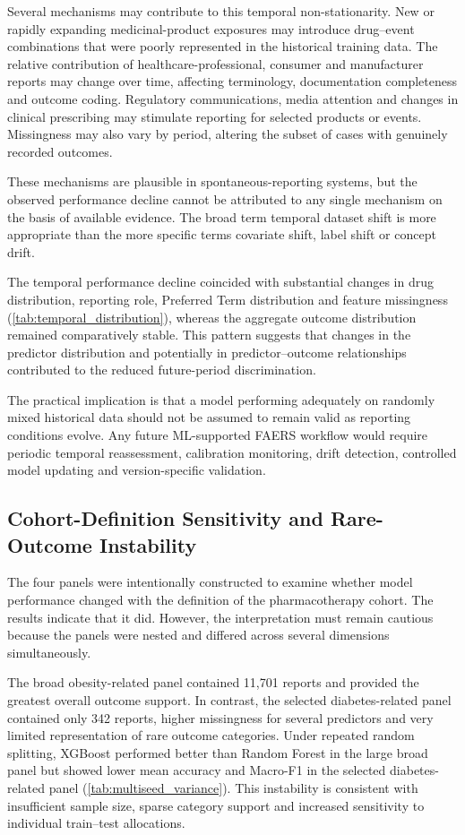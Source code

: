 \documentclass[10pt]{article}
\begin{document}
Several mechanisms may contribute to this temporal non-stationarity. New or rapidly expanding medicinal-product exposures may introduce drug--event combinations that were poorly represented in the historical training data. The relative contribution of healthcare-professional, consumer and manufacturer reports may change over time, affecting terminology, documentation completeness and outcome coding. Regulatory communications, media attention and changes in clinical prescribing may stimulate reporting for selected products or events. Missingness may also vary by period, altering the subset of cases with genuinely recorded outcomes.

These mechanisms are plausible in spontaneous-reporting systems, but the observed performance decline cannot be attributed to any single mechanism on the basis of available evidence. The broad term temporal dataset shift is more appropriate than the more specific terms covariate shift, label shift or concept drift.

The temporal performance decline coincided with substantial changes in drug distribution, reporting role, Preferred Term distribution and feature missingness (\cref{tab:temporal_distribution}), whereas the aggregate outcome distribution remained comparatively stable. This pattern suggests that changes in the predictor distribution and potentially in predictor--outcome relationships contributed to the reduced future-period discrimination.

The practical implication is that a model performing adequately on randomly mixed historical data should not be assumed to remain valid as reporting conditions evolve. Any future ML-supported FAERS workflow would require periodic temporal reassessment, calibration monitoring, drift detection, controlled model updating and version-specific validation.

\subsection{Cohort-Definition Sensitivity and Rare-Outcome Instability}
The four panels were intentionally constructed to examine whether model performance changed with the definition of the pharmacotherapy cohort. The results indicate that it did. However, the interpretation must remain cautious because the panels were nested and differed across several dimensions simultaneously.

The broad obesity-related panel contained 11,701 reports and provided the greatest overall outcome support. In contrast, the selected diabetes-related panel contained only 342 reports, higher missingness for several predictors and very limited representation of rare outcome categories. Under repeated random splitting, XGBoost performed better than Random Forest in the large broad panel but showed lower mean accuracy and Macro-F1 in the selected diabetes-related panel (\cref{tab:multiseed_variance}). This instability is consistent with insufficient sample size, sparse category support and increased sensitivity to individual train--test allocations.
\end{document}
